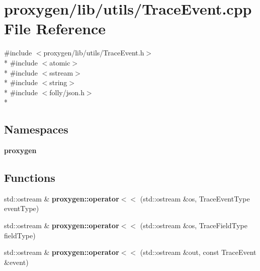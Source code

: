 \section{proxygen/lib/utils/\+Trace\+Event.cpp File Reference}
\label{TraceEvent_8cpp}
{\ttfamily \#include $<$proxygen/lib/utils/\+Trace\+Event.\+h$>$}\\*
{\ttfamily \#include $<$atomic$>$}\\*
{\ttfamily \#include $<$sstream$>$}\\*
{\ttfamily \#include $<$string$>$}\\*
{\ttfamily \#include $<$folly/json.\+h$>$}\\*
\subsection*{Namespaces}
\begin{DoxyCompactItemize}
\item 
 {\bf proxygen}
\end{DoxyCompactItemize}
\subsection*{Functions}
\begin{DoxyCompactItemize}
\item 
std\+::ostream \& {\bf proxygen\+::operator$<$$<$} (std\+::ostream \&os, Trace\+Event\+Type event\+Type)
\item 
std\+::ostream \& {\bf proxygen\+::operator$<$$<$} (std\+::ostream \&os, Trace\+Field\+Type field\+Type)
\item 
std\+::ostream \& {\bf proxygen\+::operator$<$$<$} (std\+::ostream \&out, const Trace\+Event \&event)
\end{DoxyCompactItemize}
